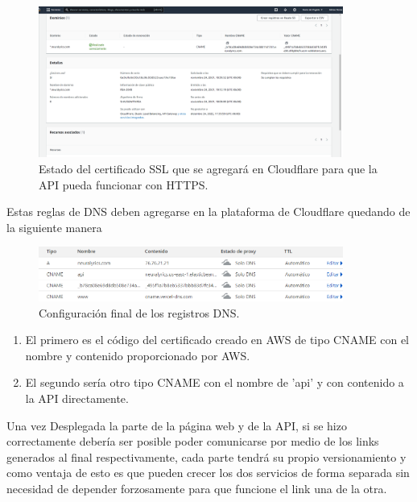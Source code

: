 \documentclass[12pt, a4paper, titlepage]{article}
\begin{document}
	
	\begin{figure}[H] 
		\includegraphics[width=10cm]{./Imagenes/DnsSSL/DNS_aws.png}
		\centering \caption{Estado del certificado SSL que se agregará en Cloudflare para que la API pueda funcionar con HTTPS.}
	\end{figure}
	Estas reglas de DNS deben agregarse en la plataforma de Cloudflare quedando de la siguiente manera 
	\begin{figure}[H] 
		\includegraphics[width=10cm]{./Imagenes/DnsSSL/Config_DNS.png}
		\centering \caption{Configuración final de los registros DNS.}
	\end{figure}
	\begin{enumerate}
	\item El primero es el código del certificado creado en AWS de tipo CNAME con el nombre y contenido proporcionado por AWS.
	\item El segundo sería otro tipo CNAME con el nombre de 'api' y con contenido a la API directamente.
	\end{enumerate}
	Una vez Desplegada la parte de la página web y de la API, si se hizo correctamente debería ser posible poder comunicarse por medio de los links generados al final respectivamente, cada parte tendrá su propio versionamiento y como ventaja de esto es que pueden crecer los dos servicios de forma separada sin necesidad de depender forzosamente para que funcione el link una de la otra.
	\newpage
\end{document}
